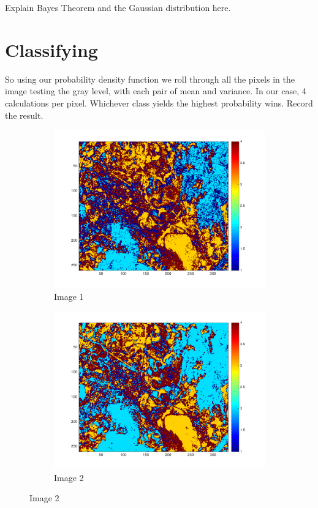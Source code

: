 \documentclass[12pt,a4paper]{report}
\begin{document}
Explain Bayes Theorem and the Gaussian distribution here.

\section*{Classifying}
So using our probability density function we roll through all the pixels in the image testing the gray level, with each pair of mean and variance. In our case, 4 calculations per pixel. Whichever class yields the highest probability wins. Record the  result.

\begin{figure}[!ht]
	\begin{subfigure}{0.5\textwidth}
	\centering
	\includegraphics[width=1.0\textwidth]{Feature1ClassificationResult}	
	\caption*{Image 1}
	\end{subfigure}
	\begin{subfigure}{0.5\textwidth}
	\centering
	\includegraphics[width=1.0\textwidth]{Feature2ClassificationResult}
	\caption*{Image 2}
	\end{subfigure}
\end{figure}
\end{document}
